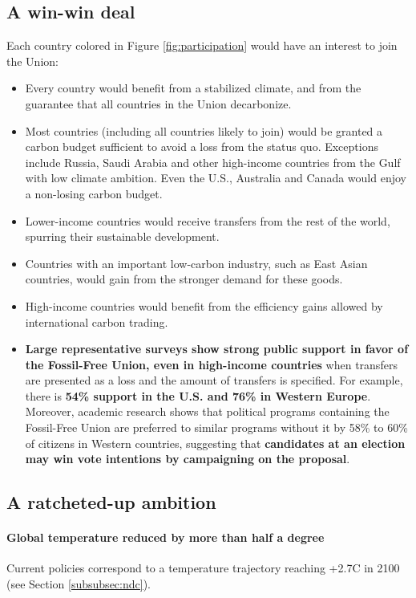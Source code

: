 \documentclass[12pt,english]{article}
\begin{document}
\subsection{A win-win deal\label{subsec:winwin}}

Each country colored in Figure \ref{fig:participation} would have an interest to join the Union: 
\begin{itemize}
  \item Every country would benefit from a stabilized climate, and from the guarantee that all countries in the Union decarbonize.
  \item Most countries (including all countries likely to join) would be granted a carbon budget sufficient to avoid a loss from the status quo. Exceptions include Russia, Saudi Arabia and other high-income countries from the Gulf with low climate ambition. Even the U.S., Australia and Canada would enjoy a non-losing carbon budget.
  \item Lower-income countries would receive transfers from the rest of the world, spurring their sustainable development.
  \item Countries with an important low-carbon industry, such as East Asian countries, would gain from the stronger demand for these goods.
  \item High-income countries would benefit from the efficiency gains allowed by international carbon trading.
  \item \textbf{Large representative surveys show strong public support in favor of the Fossil-Free Union, even in high-income countries} when transfers are presented as a loss and the amount of transfers is specified. For example, there is\textbf{ 54\% support in the U.S. and 76\% in Western Europe}.\cite{fabre_international_2023} %
  Moreover, academic research shows that political programs containing the Fossil-Free Union are preferred to similar programs without it by 58\% to 60\% of citizens in Western countries, suggesting that \textbf{candidates at an election may win vote intentions by campaigning on the proposal}.\cite{fabre_international_2023}
\end{itemize}

\subsection{A ratcheted-up ambition\label{subsec:ambition}}

\paragraph{Global temperature reduced by more than half a degree}
Current policies correspond to a temperature trajectory reaching +2.7\textdegree{}C in 2100 (see Section \ref{subsubsec:ndc}). %
\end{document}
